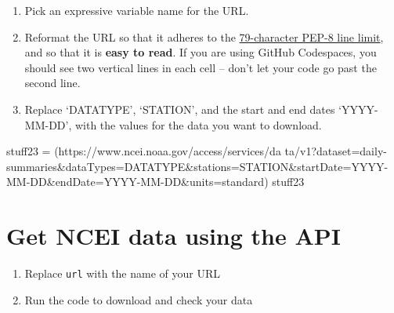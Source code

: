 \documentclass[
  letterpaper,
  DIV=11,
  numbers=noendperiod,
  oneside]{scrreprt}
\newenvironment{Shaded}{\begin{snugshade}}{\end{snugshade}}
\newcommand{\NormalTok}[1]{\textcolor[rgb]{0.00,0.23,0.31}{#1}}
\newcommand{\OperatorTok}[1]{\textcolor[rgb]{0.37,0.37,0.37}{#1}}
\newcommand{\StringTok}[1]{\textcolor[rgb]{0.13,0.47,0.30}{#1}}
\providecommand{\tightlist}{%
  \setlength{\itemsep}{0pt}\setlength{\parskip}{0pt}}
\begin{document}
\begin{tcolorbox}[enhanced jigsaw, colbacktitle=quarto-callout-color!10!white, opacityback=0, bottomtitle=1mm, toptitle=1mm, bottomrule=.15mm, left=2mm, colframe=quarto-callout-color-frame, leftrule=.75mm, opacitybacktitle=0.6, colback=white, rightrule=.15mm, toprule=.15mm, breakable, titlerule=0mm, title=\textcolor{quarto-callout-color}{\faInfo}\hspace{0.5em}{Try It: Format your URL for readability}, coltitle=black, arc=.35mm]

\begin{enumerate}
\def\labelenumi{\arabic{enumi}.}
\tightlist
\item
  Pick an expressive variable name for the URL.
\item
  Reformat the URL so that it adheres to the
  \href{https://peps.python.org/pep-0008/\#maximum-line-length}{79-character
  PEP-8 line limit}, and so that it is \textbf{easy to read}. If you are
  using GitHub Codespaces, you should see two vertical lines in each
  cell -- don't let your code go past the second line.
\item
  Replace `DATATYPE', `STATION', and the start and end dates
  `YYYY-MM-DD', with the values for the data you want to download.
\end{enumerate}

\end{tcolorbox}

\begin{Shaded}
\begin{Highlighting}[]
\NormalTok{stuff23 }\OperatorTok{=}\NormalTok{ (}\StringTok{\textquotesingle{}https://www.ncei.noaa.gov/access/services/da\textquotesingle{}}
\StringTok{\textquotesingle{}ta/v1?dataset=daily{-}summaries\&dataTypes=DATATYPE\&stations=STATION\&startDate=YYYY{-}MM{-}DD\&endDate=YYYY{-}MM{-}DD\&units=standard\textquotesingle{}}\NormalTok{)}
\NormalTok{stuff23}
\end{Highlighting}
\end{Shaded}

\section{Get NCEI data using the API}\label{get-ncei-data-using-the-api}

\begin{tcolorbox}[enhanced jigsaw, colbacktitle=quarto-callout-color!10!white, opacityback=0, bottomtitle=1mm, toptitle=1mm, bottomrule=.15mm, left=2mm, colframe=quarto-callout-color-frame, leftrule=.75mm, opacitybacktitle=0.6, colback=white, rightrule=.15mm, toprule=.15mm, breakable, titlerule=0mm, title=\textcolor{quarto-callout-color}{\faInfo}\hspace{0.5em}{Try It}, coltitle=black, arc=.35mm]

\begin{enumerate}
\def\labelenumi{\arabic{enumi}.}
\tightlist
\item
  Replace \texttt{url} with the name of your URL
\item
  Run the code to download and check your data
\end{enumerate}

\end{tcolorbox}
\end{document}
